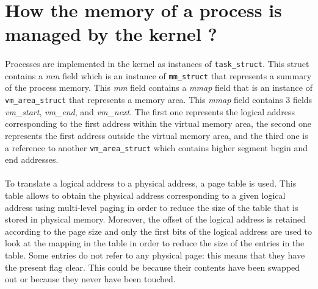 \documentclass[a4paper, 11pt, oneside]{article}
\begin{document}
\section{How the memory of a process is managed by the kernel ?}\label{section2}

\paragraph{}Processes are implemented in the kernel as instances of \texttt{task\_struct}. 
This struct contains a \textit{mm} field which is an instance of \texttt{mm\_struct} that represents a 
summary of the process memory. This \textit{mm} field contains a \textit{mmap} field that is an instance of \texttt{vm\_area\_struct} that represents 
a memory area. This \textit{mmap} field contains 3 fields \textit{vm\_start}, \textit{vm\_end}, and \textit{vm\_next}. The first one represents the logical 
address corresponding to the first address within the virtual memory area, the second one represents the first address outside the virtual memory area, and the 
third one is a reference to another \texttt{vm\_area\_struct} which contains higher segment begin and end addresses. 

\paragraph{}To translate a logical address to a physical address, a page table is used. This table allows 
to obtain the physical address corresponding to a given logical address using multi-level paging in order to reduce the size of the table that is stored in physical memory.
Moreover, the offset of the logical address is retained according to the page size and only the first bits of the logical address are used to look at the mapping in the table in order to 
reduce the size of the entries in the table. Some entries do not refer to any physical page: this means that they have the present flag clear. This could be because their contents have been swapped out or because they never have been touched.
\end{document}

